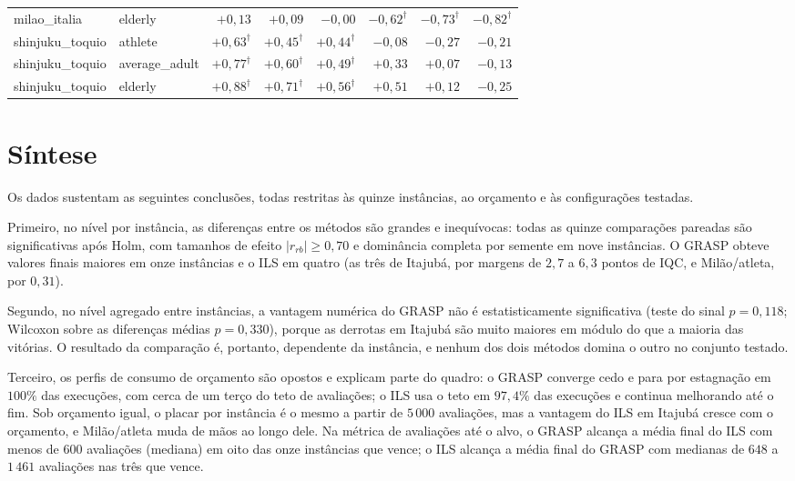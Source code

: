 \documentclass[11pt,a4paper]{article}
\begin{document}
\begin{longtable}{@{}l l r r r r r r@{}}
milao\_italia & elderly & $+0{,}13$ & $+0{,}09$ & $-0{,}00$ & $-0{,}62^{\dagger}$ & $-0{,}73^{\dagger}$ & $-0{,}82^{\dagger}$ \\
shinjuku\_toquio & athlete & $+0{,}63^{\dagger}$ & $+0{,}45^{\dagger}$ & $+0{,}44^{\dagger}$ & $-0{,}08$ & $-0{,}27$ & $-0{,}21$ \\
shinjuku\_toquio & average\_adult & $+0{,}77^{\dagger}$ & $+0{,}60^{\dagger}$ & $+0{,}49^{\dagger}$ & $+0{,}33$ & $+0{,}07$ & $-0{,}13$ \\
shinjuku\_toquio & elderly & $+0{,}88^{\dagger}$ & $+0{,}71^{\dagger}$ & $+0{,}56^{\dagger}$ & $+0{,}51$ & $+0{,}12$ & $-0{,}25$ \\
\bottomrule
\end{longtable}

\section{Síntese}
\label{sec:comp-sintese}

Os dados sustentam as seguintes conclusões, todas restritas às quinze instâncias, ao orçamento e às configurações testadas.

Primeiro, no nível por instância, as diferenças entre os métodos são grandes e inequívocas: todas as quinze comparações pareadas são significativas após Holm, com tamanhos de efeito $|r_{rb}| \ge 0{,}70$ e dominância completa por semente em nove instâncias. O GRASP obteve valores finais maiores em onze instâncias e o ILS em quatro (as três de Itajubá, por margens de $2{,}7$ a $6{,}3$ pontos de IQC, e Milão/atleta, por $0{,}31$).

Segundo, no nível agregado entre instâncias, a vantagem numérica do GRASP não é estatisticamente significativa (teste do sinal $p = 0{,}118$; Wilcoxon sobre as diferenças médias $p = 0{,}330$), porque as derrotas em Itajubá são muito maiores em módulo do que a maioria das vitórias. O resultado da comparação é, portanto, dependente da instância, e nenhum dos dois métodos domina o outro no conjunto testado.

Terceiro, os perfis de consumo de orçamento são opostos e explicam parte do quadro: o GRASP converge cedo e para por estagnação em $100\%$ das execuções, com cerca de um terço do teto de avaliações; o ILS usa o teto em $97{,}4\%$ das execuções e continua melhorando até o fim. Sob orçamento igual, o placar por instância é o mesmo a partir de $5\,000$ avaliações, mas a vantagem do ILS em Itajubá cresce com o orçamento, e Milão/atleta muda de mãos ao longo dele. Na métrica de avaliações até o alvo, o GRASP alcança a média final do ILS com menos de $600$ avaliações (mediana) em oito das onze instâncias que vence; o ILS alcança a média final do GRASP com medianas de $648$ a $1\,461$ avaliações nas três que vence.
\end{document}
